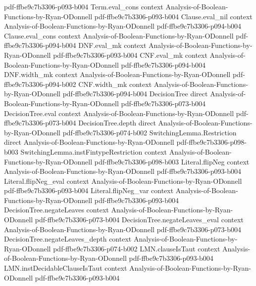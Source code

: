 \begin{theorem}
  {pdf-ffbe9c7b3306-p093-b004}
\proofstep
  {Term.eval_cons}
  {context}
  {Analysis-of-Boolean-Functions-by-Ryan-ODonnell}
  {pdf-ffbe9c7b3306-p093-b004}
\proofstep
  {Clause.eval_nil}
  {context}
  {Analysis-of-Boolean-Functions-by-Ryan-ODonnell}
  {pdf-ffbe9c7b3306-p094-b004}
\proofstep
  {Clause.eval_cons}
  {context}
  {Analysis-of-Boolean-Functions-by-Ryan-ODonnell}
  {pdf-ffbe9c7b3306-p094-b004}
\proofstep
  {DNF.eval_mk}
  {context}
  {Analysis-of-Boolean-Functions-by-Ryan-ODonnell}
  {pdf-ffbe9c7b3306-p093-b004}
\proofstep
  {CNF.eval_mk}
  {context}
  {Analysis-of-Boolean-Functions-by-Ryan-ODonnell}
  {pdf-ffbe9c7b3306-p094-b004}
\proofstep
  {DNF.width_mk}
  {context}
  {Analysis-of-Boolean-Functions-by-Ryan-ODonnell}
  {pdf-ffbe9c7b3306-p094-b002}
\proofstep
  {CNF.width_mk}
  {context}
  {Analysis-of-Boolean-Functions-by-Ryan-ODonnell}
  {pdf-ffbe9c7b3306-p094-b004}
\proofstep
  {DecisionTree}
  {direct}
  {Analysis-of-Boolean-Functions-by-Ryan-ODonnell}
  {pdf-ffbe9c7b3306-p073-b004}
\proofstep
  {DecisionTree.eval}
  {context}
  {Analysis-of-Boolean-Functions-by-Ryan-ODonnell}
  {pdf-ffbe9c7b3306-p073-b004}
\proofstep
  {DecisionTree.depth}
  {direct}
  {Analysis-of-Boolean-Functions-by-Ryan-ODonnell}
  {pdf-ffbe9c7b3306-p074-b002}
\proofstep
  {SwitchingLemma.Restriction}
  {direct}
  {Analysis-of-Boolean-Functions-by-Ryan-ODonnell}
  {pdf-ffbe9c7b3306-p098-b003}
\proofstep
  {SwitchingLemma.instFintypeRestriction}
  {context}
  {Analysis-of-Boolean-Functions-by-Ryan-ODonnell}
  {pdf-ffbe9c7b3306-p098-b003}
\proofstep
  {Literal.flipNeg}
  {context}
  {Analysis-of-Boolean-Functions-by-Ryan-ODonnell}
  {pdf-ffbe9c7b3306-p093-b004}
\proofstep
  {Literal.flipNeg_eval}
  {context}
  {Analysis-of-Boolean-Functions-by-Ryan-ODonnell}
  {pdf-ffbe9c7b3306-p093-b004}
\proofstep
  {Literal.flipNeg_var}
  {context}
  {Analysis-of-Boolean-Functions-by-Ryan-ODonnell}
  {pdf-ffbe9c7b3306-p093-b004}
\proofstep
  {DecisionTree.negateLeaves}
  {context}
  {Analysis-of-Boolean-Functions-by-Ryan-ODonnell}
  {pdf-ffbe9c7b3306-p073-b004}
\proofstep
  {DecisionTree.negateLeaves_eval}
  {context}
  {Analysis-of-Boolean-Functions-by-Ryan-ODonnell}
  {pdf-ffbe9c7b3306-p073-b004}
\proofstep
  {DecisionTree.negateLeaves_depth}
  {context}
  {Analysis-of-Boolean-Functions-by-Ryan-ODonnell}
  {pdf-ffbe9c7b3306-p074-b002}
\proofstep
  {LMN.clauseIsTaut}
  {context}
  {Analysis-of-Boolean-Functions-by-Ryan-ODonnell}
  {pdf-ffbe9c7b3306-p093-b004}
\proofstep
  {LMN.instDecidableClauseIsTaut}
  {context}
  {Analysis-of-Boolean-Functions-by-Ryan-ODonnell}
  {pdf-ffbe9c7b3306-p093-b004}

\end{theorem}
